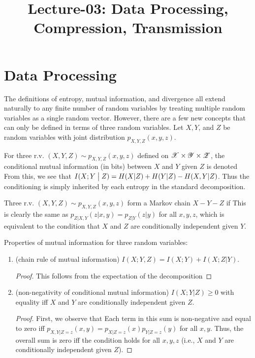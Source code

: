 \documentclass[letterpaper,10pt,english]{article}
\title{Lecture-03: Data Processing, Compression, Transmission}
\author{}
\begin{document}
\maketitle

\section{Data Processing}
The definitions of entropy, mutual information, and divergence all extend naturally to any finite number of random variables by treating multiple random variables as a single random vector. However, there are a few new concepts that can only be defined in terms of three random variables. Let $X, Y$, and $Z$ be random variables with joint distribution $p_{X,Y,Z}(x,y,z)$. 
\begin{defn} 
For three r.v. $(X,Y,Z) \sim p_{X,Y,Z}(x,y,z)$ defined on $\mathscr{X} \times \mathscr{Y} \times \mathscr{Z}$, 
the conditional mutual information (in bits) between $X$ and $Y$ given $Z$ is denoted 
From this, we see that $I(X;Y\; \big\vert \; Z) = H(X | Z) + H(Y|Z) - H(X,Y |Z)$. 
Thus the conditioning is simply inherited by each entropy in the standard decomposition. 
\end{defn} 
\begin{defn} 
Three r.v. $(X, Y, Z) \sim p_{X,Y, Z} (x, y, z)$ form a Markov chain $X -Y - Z$ if 
This is clearly the same as $p_{Z|X,Y} (z|x, y) = p_{Z|Y} (z | y)$ for all $x, y, z$, 
which is equivalent to the condition that $X$ and $Z$ are conditionally independent given $Y$. 
\end{defn} 

\begin{lem}
Properties of mutual information for three random variables:
\begin{enumerate}
\item (chain rule of mutual information) $I(X;Y,Z)=I(X;Y)+I(X;Z|Y)$. 
\begin{proof}
This follows from the expectation of the decomposition
\end{proof} 
\item (non-negativity of conditional mutual information) $I (X ; Y |Z ) \ge 0$ with equality iff $X$ and $Y$ are conditionally independent given $Z$.
\begin{proof}
First, we observe that
Each term in this sum is non-negative and equal to zero iff $p_{X,Y|Z=z}(x,y) = p_{X|Z=z}(x)p_{Y|Z=z}(y)$ for all $x,y$. 
Thus, the overall sum is zero iff the condition holds for all $x, y, z$ (i.e., $X$ and $Y$ are conditionally independent given $Z$). 
\end{proof} 
\end{enumerate}
\end{lem} 
    
\end{document}
